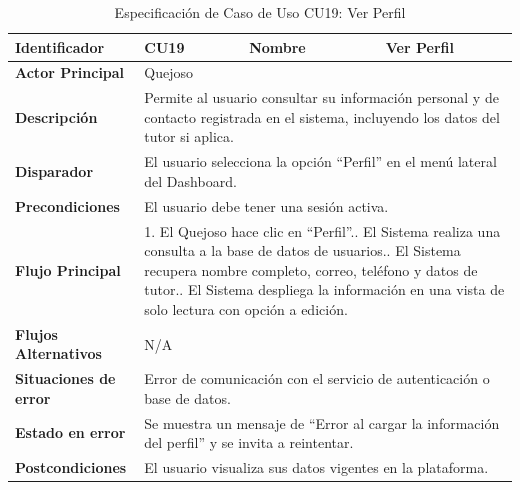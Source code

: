 \begingroup
\setlength{\parskip}{0pt}
\begin{longtable}{|p{3.5cm}|p{2cm}|p{2.5cm}|p{7cm}|}
\caption{Especificación de Caso de Uso CU19: Ver Perfil}
\label{tab:cu19_ver_perfil} \\
\hline
\textbf{Identificador} & CU19 & \textbf{Nombre} & Ver Perfil \\ \hline
\textbf{Actor Principal} & \multicolumn{3}{p{11.5cm}|}{Quejoso} \\ \hline
\textbf{Descripción} & \multicolumn{3}{p{11.5cm}|}{Permite al usuario consultar su información personal y de contacto registrada en el sistema, incluyendo los datos del tutor si aplica.} \\ \hline
\textbf{Disparador} & \multicolumn{3}{p{11.5cm}|}{El usuario selecciona la opción ``Perfil'' en el menú lateral del Dashboard.} \\ \hline
\textbf{Precondiciones} & \multicolumn{3}{p{11.5cm}|}{El usuario debe tener una sesión activa.} \\ \hline
\textbf{Flujo Principal} & \multicolumn{3}{p{11.5cm}|}{1. El Quejoso hace clic en ``Perfil''.\newline 2. El Sistema realiza una consulta a la base de datos de usuarios.\newline 3. El Sistema recupera nombre completo, correo, teléfono y datos de tutor.\newline 4. El Sistema despliega la información en una vista de solo lectura con opción a edición.} \\ \hline
\textbf{Flujos Alternativos} & \multicolumn{3}{p{11.5cm}|}{N/A} \\ \hline
\textbf{Situaciones de error} & \multicolumn{3}{p{11.5cm}|}{Error de comunicación con el servicio de autenticación o base de datos.} \\ \hline
\textbf{Estado en error} & \multicolumn{3}{p{11.5cm}|}{Se muestra un mensaje de ``Error al cargar la información del perfil'' y se invita a reintentar.} \\ \hline
\textbf{Postcondiciones} & \multicolumn{3}{p{11.5cm}|}{El usuario visualiza sus datos vigentes en la plataforma.} \\ \hline
\end{longtable}
\endgroup

\vspace{0.8cm}

